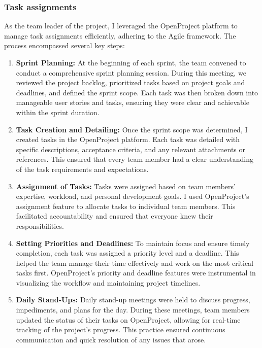     \subsubsection{Task assignments}
    As the team leader of the project, I leveraged the OpenProject platform to manage task assignments efficiently, adhering to the Agile framework. The process encompassed several key steps:
        \begin{enumerate}
            \item \textbf{Sprint Planning:} At the beginning of each sprint, the team convened to conduct a comprehensive sprint planning session. During this meeting, we reviewed the project backlog, prioritized tasks based on project goals and deadlines, and defined the sprint scope. Each task was then broken down into manageable user stories and tasks, ensuring they were clear and achievable within the sprint duration.

            \item \textbf{Task Creation and Detailing:} Once the sprint scope was determined, I created tasks in the OpenProject platform. Each task was detailed with specific descriptions, acceptance criteria, and any relevant attachments or references. This ensured that every team member had a clear understanding of the task requirements and expectations.

            \item \textbf{Assignment of Tasks:} Tasks were assigned based on team members' expertise, workload, and personal development goals. I used OpenProject’s assignment feature to allocate tasks to individual team members. This facilitated accountability and ensured that everyone knew their responsibilities.

            \item \textbf{Setting Priorities and Deadlines:} To maintain focus and ensure timely completion, each task was assigned a priority level and a deadline. This helped the team manage their time effectively and work on the most critical tasks first. OpenProject’s priority and deadline features were instrumental in visualizing the workflow and maintaining project timelines.

            \item \textbf{Daily Stand-Ups:} Daily stand-up meetings were held to discuss progress, impediments, and plans for the day. During these meetings, team members updated the status of their tasks on OpenProject, allowing for real-time tracking of the project’s progress. This practice ensured continuous communication and quick resolution of any issues that arose.


\end{enumerate}
